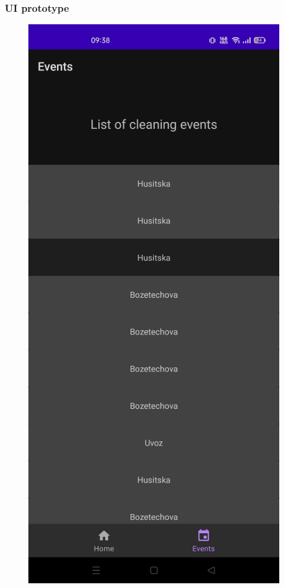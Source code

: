 \documentclass[10pt,xcolor=pdflatex,hyperref={unicode}]{beamer}
\begin{document}
\begin{frame}\frametitle{UI prototype}
    \begin{figure}
        \centering
        \begin{minipage}{0.4\textwidth}
            \centering
            \includegraphics[width=0.25\paperwidth]{img/ui1.jpg}

\end{minipage}
\end{figure}
\end{frame}
\end{document}

